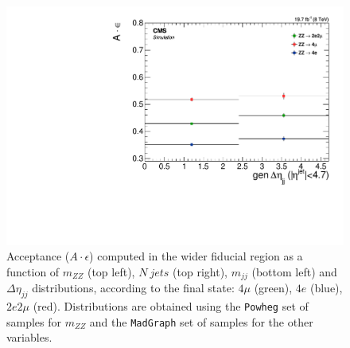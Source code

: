\begin{figure}[hbtp]
\begin{center}
    \includegraphics[width=\cmsFigWidth]{Figures/DiffAcceptance_Deta_Mad}
    \caption{Acceptance ($A \cdot \epsilon$) computed in the wider fiducial region as a function of $m_{ZZ}$  (top left), $N\ jets$  (top right), $m_{jj}$ (bottom left) and $\Delta\eta_{jj}$
distributions, according to the final state: 
      $4\mu$ (green), $4e$ (blue), $2e2\mu$  (red). Distributions are obtained using the  \texttt{Powheg} set of samples for  $m_{ZZ}$ and 
     the  \texttt{MadGraph} set of samples for the other variables.} 
    \label{fig:A_diff}
  \end{center}
\end{figure}
